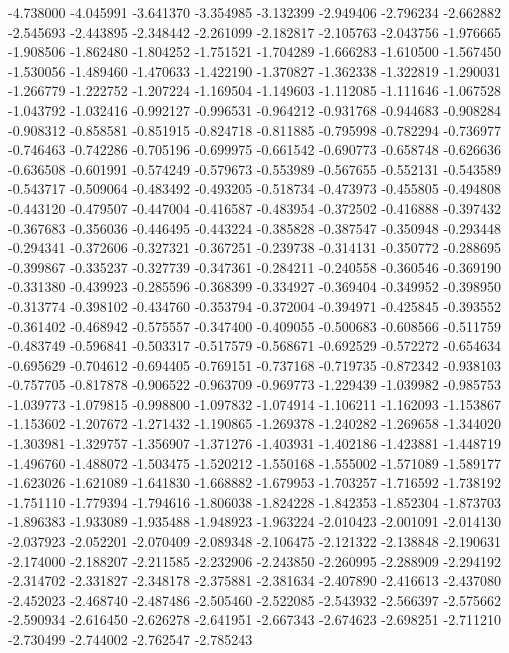 -4.738000
-4.045991
-3.641370
-3.354985
-3.132399
-2.949406
-2.796234
-2.662882
-2.545693
-2.443895
-2.348442
-2.261099
-2.182817
-2.105763
-2.043756
-1.976665
-1.908506
-1.862480
-1.804252
-1.751521
-1.704289
-1.666283
-1.610500
-1.567450
-1.530056
-1.489460
-1.470633
-1.422190
-1.370827
-1.362338
-1.322819
-1.290031
-1.266779
-1.222752
-1.207224
-1.169504
-1.149603
-1.112085
-1.111646
-1.067528
-1.043792
-1.032416
-0.992127
-0.996531
-0.964212
-0.931768
-0.944683
-0.908284
-0.908312
-0.858581
-0.851915
-0.824718
-0.811885
-0.795998
-0.782294
-0.736977
-0.746463
-0.742286
-0.705196
-0.699975
-0.661542
-0.690773
-0.658748
-0.626636
-0.636508
-0.601991
-0.574249
-0.579673
-0.553989
-0.567655
-0.552131
-0.543589
-0.543717
-0.509064
-0.483492
-0.493205
-0.518734
-0.473973
-0.455805
-0.494808
-0.443120
-0.479507
-0.447004
-0.416587
-0.483954
-0.372502
-0.416888
-0.397432
-0.367683
-0.356036
-0.446495
-0.443224
-0.385828
-0.387547
-0.350948
-0.293448
-0.294341
-0.372606
-0.327321
-0.367251
-0.239738
-0.314131
-0.350772
-0.288695
-0.399867
-0.335237
-0.327739
-0.347361
-0.284211
-0.240558
-0.360546
-0.369190
-0.331380
-0.439923
-0.285596
-0.368399
-0.334927
-0.369404
-0.349952
-0.398950
-0.313774
-0.398102
-0.434760
-0.353794
-0.372004
-0.394971
-0.425845
-0.393552
-0.361402
-0.468942
-0.575557
-0.347400
-0.409055
-0.500683
-0.608566
-0.511759
-0.483749
-0.596841
-0.503317
-0.517579
-0.568671
-0.692529
-0.572272
-0.654634
-0.695629
-0.704612
-0.694405
-0.769151
-0.737168
-0.719735
-0.872342
-0.938103
-0.757705
-0.817878
-0.906522
-0.963709
-0.969773
-1.229439
-1.039982
-0.985753
-1.039773
-1.079815
-0.998800
-1.097832
-1.074914
-1.106211
-1.162093
-1.153867
-1.153602
-1.207672
-1.271432
-1.190865
-1.269378
-1.240282
-1.269658
-1.344020
-1.303981
-1.329757
-1.356907
-1.371276
-1.403931
-1.402186
-1.423881
-1.448719
-1.496760
-1.488072
-1.503475
-1.520212
-1.550168
-1.555002
-1.571089
-1.589177
-1.623026
-1.621089
-1.641830
-1.668882
-1.679953
-1.703257
-1.716592
-1.738192
-1.751110
-1.779394
-1.794616
-1.806038
-1.824228
-1.842353
-1.852304
-1.873703
-1.896383
-1.933089
-1.935488
-1.948923
-1.963224
-2.010423
-2.001091
-2.014130
-2.037923
-2.052201
-2.070409
-2.089348
-2.106475
-2.121322
-2.138848
-2.190631
-2.174000
-2.188207
-2.211585
-2.232906
-2.243850
-2.260995
-2.288909
-2.294192
-2.314702
-2.331827
-2.348178
-2.375881
-2.381634
-2.407890
-2.416613
-2.437080
-2.452023
-2.468740
-2.487486
-2.505460
-2.522085
-2.543932
-2.566397
-2.575662
-2.590934
-2.616450
-2.626278
-2.641951
-2.667343
-2.674623
-2.698251
-2.711210
-2.730499
-2.744002
-2.762547
-2.785243
